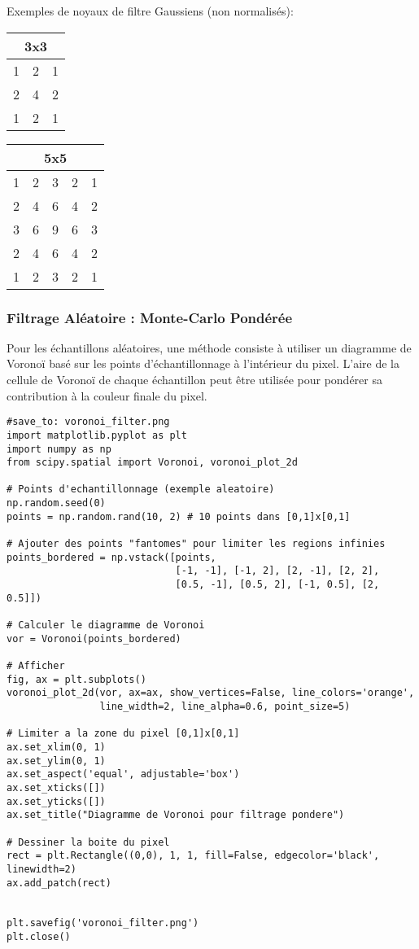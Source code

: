 \documentclass{article}
\begin{document}
Exemples de noyaux de filtre Gaussiens (non normalisés):
\begin{center}
\begin{tabular}{ccc}
\multicolumn{3}{c}{3x3} \\ \hline
1 & 2 & 1 \\
2 & 4 & 2 \\
1 & 2 & 1 \\ \hline
\end{tabular}
\qquad
\begin{tabular}{ccccc}
\multicolumn{5}{c}{5x5} \\ \hline
1 & 2 & 3 & 2 & 1 \\
2 & 4 & 6 & 4 & 2 \\
3 & 6 & 9 & 6 & 3 \\
2 & 4 & 6 & 4 & 2 \\
1 & 2 & 3 & 2 & 1 \\ \hline
\end{tabular}
\end{center}

\subsubsection{Filtrage Aléatoire : Monte-Carlo Pondérée}
Pour les échantillons aléatoires, une méthode consiste à utiliser un diagramme de Voronoï basé sur les points d'échantillonnage à l'intérieur du pixel. L'aire de la cellule de Voronoï de chaque échantillon peut être utilisée pour pondérer sa contribution à la couleur finale du pixel.

\begin{verbatim}
#save_to: voronoi_filter.png
import matplotlib.pyplot as plt
import numpy as np
from scipy.spatial import Voronoi, voronoi_plot_2d

# Points d'echantillonnage (exemple aleatoire)
np.random.seed(0)
points = np.random.rand(10, 2) # 10 points dans [0,1]x[0,1]

# Ajouter des points "fantomes" pour limiter les regions infinies
points_bordered = np.vstack([points,
                             [-1, -1], [-1, 2], [2, -1], [2, 2],
                             [0.5, -1], [0.5, 2], [-1, 0.5], [2, 0.5]])

# Calculer le diagramme de Voronoi
vor = Voronoi(points_bordered)

# Afficher
fig, ax = plt.subplots()
voronoi_plot_2d(vor, ax=ax, show_vertices=False, line_colors='orange',
                line_width=2, line_alpha=0.6, point_size=5)

# Limiter a la zone du pixel [0,1]x[0,1]
ax.set_xlim(0, 1)
ax.set_ylim(0, 1)
ax.set_aspect('equal', adjustable='box')
ax.set_xticks([])
ax.set_yticks([])
ax.set_title("Diagramme de Voronoi pour filtrage pondere")

# Dessiner la boite du pixel
rect = plt.Rectangle((0,0), 1, 1, fill=False, edgecolor='black', linewidth=2)
ax.add_patch(rect)


plt.savefig('voronoi_filter.png')
plt.close()
\end{verbatim}
\end{document}
